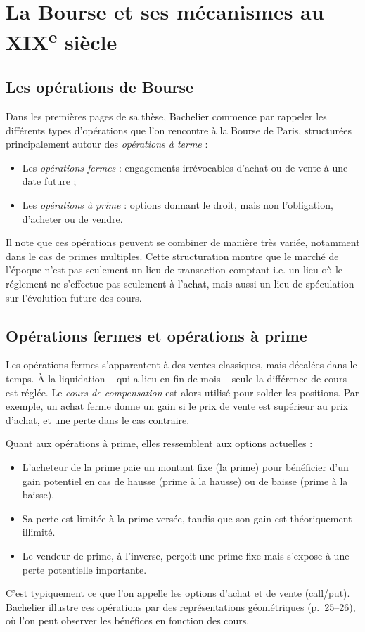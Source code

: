 \documentclass[12pt,a4paper]{article}
\begin{document}
\section{La Bourse et ses mécanismes au XIX\textsuperscript{e} siècle}

\subsection{Les opérations de Bourse}

Dans les premières pages de sa thèse, Bachelier commence par rappeler les différents types d'opérations que l’on rencontre à la Bourse de Paris, structurées principalement autour des \textit{opérations à terme} :

\begin{itemize}
  \item Les \textit{opérations fermes} : engagements irrévocables d'achat ou de vente à une date future ;
  \item Les \textit{opérations à prime} : options donnant le droit, mais non l'obligation, d’acheter ou de vendre.
\end{itemize}

Il note que ces opérations peuvent se combiner de manière très variée, notamment dans le cas de primes multiples. Cette structuration montre que le marché de l’époque n’est pas seulement un lieu de transaction comptant i.e. un lieu où le réglement ne s'effectue pas seulement à l'achat, mais aussi un lieu de spéculation sur l’évolution future des cours.

\subsection{Opérations fermes et opérations à prime}

Les opérations fermes s’apparentent à des ventes classiques, mais décalées dans le temps. À la liquidation -- qui a lieu en fin de mois -- seule la différence de cours est réglée. Le \textit{cours de compensation} est alors utilisé pour solder les positions. Par exemple, un achat ferme donne un gain si le prix de vente est supérieur au prix d’achat, et une perte dans le cas contraire.

Quant aux opérations à prime, elles ressemblent aux options actuelles :
\begin{itemize}
  \item L’acheteur de la prime paie un montant fixe (la prime) pour bénéficier d’un gain potentiel en cas de hausse (prime à la hausse) ou de baisse (prime à la baisse).
  \item Sa perte est limitée à la prime versée, tandis que son gain est théoriquement illimité.
  \item Le vendeur de prime, à l’inverse, perçoit une prime fixe mais s’expose à une perte potentielle importante.
\end{itemize}
C'est typiquement ce que l'on appelle les options d'achat et de vente (call/put).\\
Bachelier illustre ces opérations par des représentations géométriques (p.~25–26), où l'on peut observer les bénéfices en fonction des cours.
\end{document}
